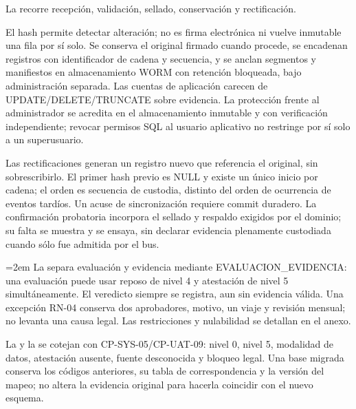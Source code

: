 La  recorre recepción, validación, sellado, conservación y rectificación.


El hash permite detectar alteración; no es firma electrónica ni vuelve inmutable una fila por sí solo. Se conserva el original firmado cuando procede, se encadenan registros con identificador de cadena y secuencia, y se anclan segmentos y manifiestos en almacenamiento WORM con retención bloqueada, bajo administración separada. Las cuentas de aplicación carecen de UPDATE/DELETE/TRUNCATE sobre evidencia. La protección frente al administrador se acredita en el almacenamiento inmutable y con verificación independiente; revocar permisos SQL al usuario aplicativo no restringe por sí solo a un superusuario.

Las rectificaciones generan un registro nuevo que referencia el original, sin sobrescribirlo. El primer hash previo es NULL y existe un único inicio por cadena; el orden es secuencia de custodia, distinto del orden de ocurrencia de eventos tardíos. Un acuse de sincronización requiere commit duradero. La confirmación probatoria incorpora el sellado y respaldo exigidos por el dominio; su falta se muestra y se ensaya, sin declarar evidencia plenamente custodiada cuando sólo fue admitida por el bus.

\begingroup\emergencystretch=2em
La  separa evaluación y evidencia mediante \textsf{EVALUACION\_\allowbreak{}EVIDENCIA}: una evaluación puede usar reposo de nivel 4 y atestación de nivel 5 simultáneamente. El veredicto siempre se registra, aun sin evidencia válida. Una excepción RN-04 conserva dos aprobadores, motivo, un viaje y revisión mensual; no levanta una causa legal. Las restricciones y nulabilidad se detallan en el anexo.\par\endgroup


La  y la  se cotejan con CP-SYS-05/CP-UAT-09: nivel 0, nivel 5, modalidad de datos, atestación ausente, fuente desconocida y bloqueo legal. Una base migrada conserva los códigos anteriores, su tabla de correspondencia y la versión del mapeo; no altera la evidencia original para hacerla coincidir con el nuevo esquema.

